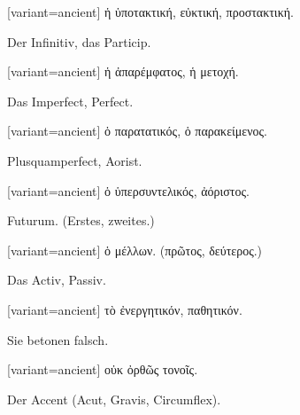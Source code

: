\switchcolumn

\begin{greek}[variant=ancient]%
ἡ ὑποτακτική, εὐκτική, προστακτική.

\end{greek}%
\switchcolumn*

Der Infinitiv, das Particip. 

\switchcolumn

\begin{greek}[variant=ancient]%
ἡ ἀπαρέμφατος, ἡ μετοχή.

\end{greek}%
\switchcolumn*

Das Imperfect, Perfect. 

\switchcolumn

\begin{greek}[variant=ancient]%
ὁ παρατατικός, ὁ παρακείμενος.

\end{greek}%
\switchcolumn*

Plus\textcompwordmark{}quamperfect, Aorist. 

\switchcolumn

\begin{greek}[variant=ancient]%
ὁ ὑπερσυντελικός, ἀόριστος.

\end{greek}%
\switchcolumn*

Futurum. (Erstes, zweites.) 

\switchcolumn

\begin{greek}[variant=ancient]%
ὁ μέλλων. (πρῶτος, δεύτερος.)

\end{greek}%
\switchcolumn*

Das Activ, Passiv. 

\switchcolumn

\begin{greek}[variant=ancient]%
τὸ ἐνεργητικόν, παθητικόν.

\end{greek}%
\switchcolumn*

Sie betonen falsch. 

\switchcolumn

\begin{greek}[variant=ancient]%
οὐκ ὀρθῶς τονοῖς.

\end{greek}%
\switchcolumn*

Der Accent (Acut, Gravis, Circumflex). 


